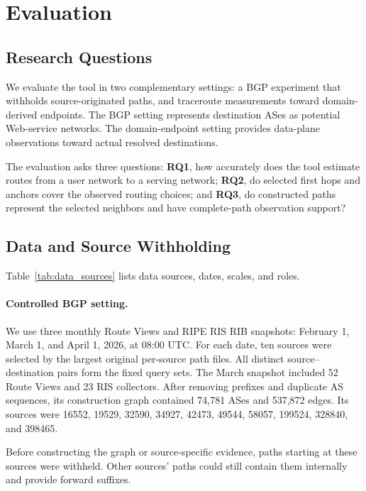 \documentclass[sigconf,anonymous,review]{acmart}
\begin{document}


\section{Evaluation}
\label{sec:evaluation}

\subsection{Research Questions}

We evaluate the tool in two complementary settings: a BGP experiment that
withholds source-originated paths, and traceroute measurements toward
domain-derived endpoints. The BGP setting represents destination ASes as
potential Web-service networks. The domain-endpoint setting provides
data-plane observations toward actual resolved destinations.

The evaluation asks three questions:
\textbf{RQ1}, how accurately does the tool estimate routes from a user network
to a serving network; \textbf{RQ2}, do selected first hops and anchors cover
the observed routing choices; and \textbf{RQ3}, do constructed paths represent
the selected neighbors and have complete-path observation support?

\subsection{Data and Source Withholding}

Table~\ref{tab:data_sources} lists data sources, dates, scales, and roles.



\paragraph{Controlled BGP setting.}
We use three monthly Route Views and RIPE RIS RIB
snapshots: February 1, March 1, and April 1, 2026, at 08:00 UTC.
For each date, ten sources were selected by the largest original per-source
path files. All distinct source--destination pairs form the fixed query sets.
The March snapshot included 52 Route Views and 23 RIS collectors. After
removing prefixes and duplicate AS sequences, its construction graph
contained 74,781 ASes and 537,872 edges. Its sources were 16552, 19529,
32590, 34927, 42473, 49544, 58057, 199524, 328840, and 398465.

Before constructing the graph or source-specific evidence, paths starting
at these sources were withheld. Other sources' paths could still contain
them internally and provide forward suffixes.
\end{document}
